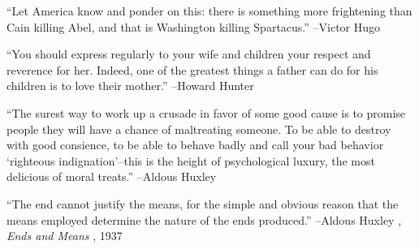 \documentclass{article}%
\begin{document}
\linebreak%
\vspace{1mm}%
\begin{minipage}{\textwidth}%
\flushleft%
“Let America know and ponder on this: there is something more frightening than Cain killing Abel, and that is Washington killing Spartacus.”%
\linebreak%
\vspace{1mm}%
–Victor Hugo%
\linebreak%
\vspace{1mm}%
\end{minipage}%
\linebreak%
\vspace{1mm}%
\begin{minipage}{\textwidth}%
\flushleft%
“You should express regularly to your wife and children your respect and reverence for her. Indeed, one of the greatest things a father can do for his children is to love their mother.”%
\linebreak%
\vspace{1mm}%
–Howard Hunter%
\linebreak%
\vspace{1mm}%
\end{minipage}%
\linebreak%
\vspace{1mm}%
\begin{minipage}{\textwidth}%
\flushleft%
“The surest way to work up a crusade in favor of some good cause is to promise people they will have a chance of maltreating someone. To be able to destroy with good consience, to be able to behave badly and call your bad behavior ‘righteous indignation’–this is the height of psychological luxury, the most delicious of moral treats.”%
\linebreak%
\vspace{1mm}%
–Aldous Huxley%
\linebreak%
\vspace{1mm}%
\end{minipage}%
\linebreak%
\vspace{1mm}%
\begin{minipage}{\textwidth}%
\flushleft%
“The end cannot justify the means, for the simple and obvious reason that the means employed determine the nature of the ends produced.”%
\linebreak%
\vspace{1mm}%
–Aldous Huxley%
, \textit{Ends and Means}%
, 1937%
\linebreak%
\vspace{1mm}%
\end{minipage}%
\end{document}
